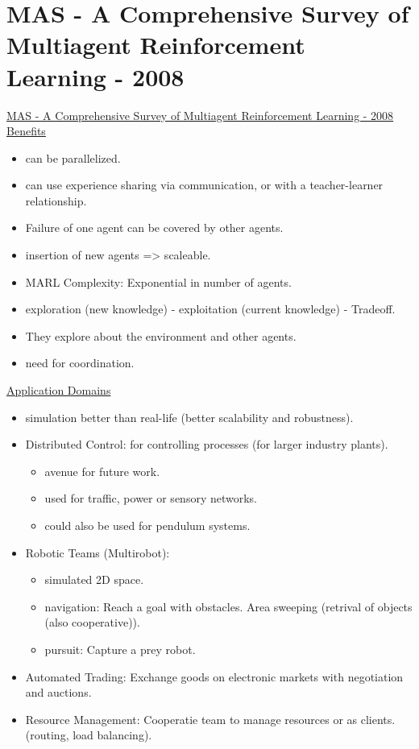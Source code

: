 \section{MAS - A Comprehensive Survey of Multiagent Reinforcement Learning - 2008}
\href{https://ieeexplore.ieee.org/abstract/document/4445757}{MAS - A Comprehensive Survey of Multiagent Reinforcement Learning - 2008}
\underline{Benefits}
\begin{itemize}[noitemsep,nolistsep]
	\item can be parallelized.
	\item can use experience sharing via communication, or with a teacher-learner relationship.
	\item Failure of one agent can be covered by other agents.
	\item insertion of new agents => scaleable.
	\item MARL Complexity: Exponential in number of agents.
	\item exploration (new knowledge) - exploitation (current knowledge) - Tradeoff.
	\item They explore about the environment and other agents.
	\item need for coordination.
\end{itemize}
\underline{Application Domains}
\begin{itemize}[noitemsep,nolistsep]
	\item simulation better than real-life (better scalability and robustness).
	\item Distributed Control: for controlling processes (for larger industry plants).
	\begin{itemize}[noitemsep,nolistsep]
		\item avenue for future work.
		\item used for traffic, power or sensory networks.
		\item could also be used for pendulum systems.
	\end{itemize}
	\item Robotic Teams (Multirobot):
	\begin{itemize}[noitemsep,nolistsep]
		\item simulated 2D space. 
		\item navigation: Reach a goal with obstacles. Area sweeping (retrival of objects (also cooperative)).
		\item pursuit: Capture a prey robot.
	\end{itemize}
	\item Automated Trading: Exchange goods on electronic markets with negotiation and auctions.
	\item Resource Management: Cooperatie team to manage resources or as clients. (routing, load balancing).
\end{itemize}
